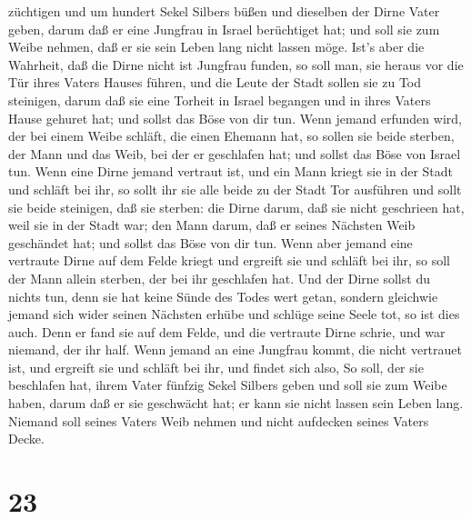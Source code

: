 züchtigen  und um hundert Sekel Silbers büßen und dieselben
der Dirne Vater geben, darum daß er eine Jungfrau in Israel berüchtiget
hat; und soll sie zum Weibe nehmen, daß er sie sein Leben lang nicht
lassen möge.  Ist's aber die Wahrheit, daß die Dirne nicht
ist Jungfrau funden,  so soll man, sie heraus vor die Tür
ihres Vaters Hauses führen, und die Leute der Stadt sollen sie zu Tod
steinigen, darum daß sie eine Torheit in Israel begangen und in ihres
Vaters Hause gehuret hat; und sollst das Böse von dir tun. 
Wenn jemand erfunden wird, der bei einem Weibe schläft, die einen
Ehemann hat, so sollen sie beide sterben, der Mann und das Weib, bei der
er geschlafen hat; und sollst das Böse von Israel tun. 
Wenn eine Dirne jemand vertraut ist, und ein Mann kriegt sie in der
Stadt und schläft bei ihr,  so sollt ihr sie alle beide zu
der Stadt Tor ausführen und sollt sie beide steinigen, daß sie sterben:
die Dirne darum, daß sie nicht geschrieen hat, weil sie in der Stadt
war; den Mann darum, daß er seines Nächsten Weib geschändet hat; und
sollst das Böse von dir tun.  Wenn aber jemand eine
vertraute Dirne auf dem Felde kriegt und ergreift sie und schläft bei
ihr, so soll der Mann allein sterben, der bei ihr geschlafen hat.
 Und der Dirne sollst du nichts tun, denn sie hat keine
Sünde des Todes wert getan, sondern gleichwie jemand sich wider seinen
Nächsten erhübe und schlüge seine Seele tot, so ist dies auch.
 Denn er fand sie auf dem Felde, und die vertraute Dirne
schrie, und war niemand, der ihr half.  Wenn jemand an eine
Jungfrau kommt, die nicht vertrauet ist, und ergreift sie und schläft
bei ihr, und findet sich also,  So soll, der sie beschlafen
hat, ihrem Vater fünfzig Sekel Silbers geben und soll sie zum Weibe
haben, darum daß er sie geschwächt hat; er kann sie nicht lassen sein
Leben lang.  Niemand soll seines Vaters Weib nehmen und
nicht aufdecken seines Vaters Decke.

\hypertarget{section-22}{%
\section{23}\label{section-22}}

